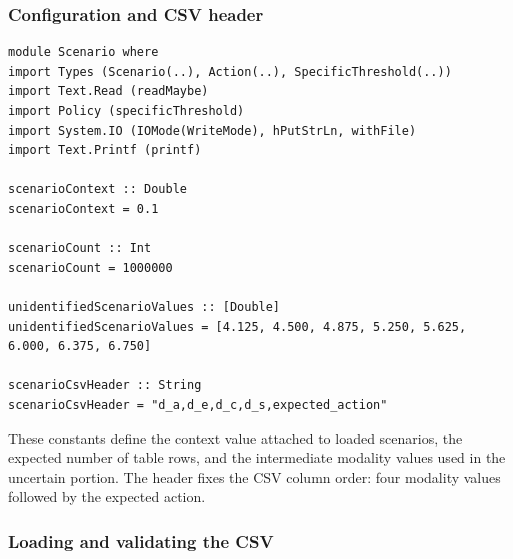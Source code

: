 \documentclass[11pt]{article}
\begin{document}
\subsubsection{Configuration and CSV header}

\begin{lstlisting}
module Scenario where
import Types (Scenario(..), Action(..), SpecificThreshold(..))
import Text.Read (readMaybe)
import Policy (specificThreshold)
import System.IO (IOMode(WriteMode), hPutStrLn, withFile)
import Text.Printf (printf)

scenarioContext :: Double
scenarioContext = 0.1

scenarioCount :: Int
scenarioCount = 1000000

unidentifiedScenarioValues :: [Double]
unidentifiedScenarioValues = [4.125, 4.500, 4.875, 5.250, 5.625, 6.000, 6.375, 6.750]

scenarioCsvHeader :: String
scenarioCsvHeader = "d_a,d_e,d_c,d_s,expected_action"
\end{lstlisting}

These constants define the context value attached to loaded scenarios, the
expected number of table rows, and the intermediate modality values used in
the uncertain portion. The header fixes the CSV column order: four modality
values followed by the expected action.

\subsubsection{Loading and validating the CSV}
\end{document}
